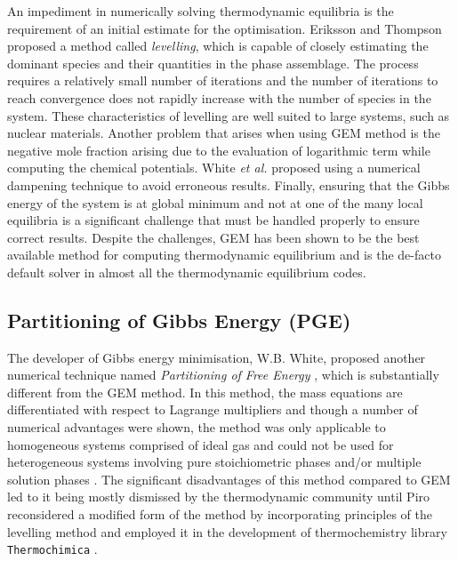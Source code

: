 	An impediment in numerically solving thermodynamic equilibria is the requirement of an initial estimate for the optimisation. Eriksson and Thompson \cite{Eriksson89} proposed a method called \emph{levelling}, which is capable of closely estimating the dominant species and their quantities in the phase assemblage. The process requires a relatively small number of iterations and the number of iterations to reach convergence does not rapidly increase with the number of species in the system. These characteristics of levelling are well suited to large systems, such as nuclear materials. Another problem that arises when using GEM method is the negative mole fraction arising due to the evaluation of logarithmic term while computing the chemical potentials. White \textit{et al.} proposed using a numerical dampening technique to avoid erroneous results. Finally, ensuring that the Gibbs energy of the system is at global minimum and not at one of the many local equilibria is a significant challenge that must be handled properly to ensure correct results. Despite the challenges, GEM has been shown to be the best available method for computing thermodynamic equilibrium and is the de-facto default solver in almost all the thermodynamic equilibrium codes.

	\subsection{Partitioning of Gibbs Energy (PGE)}
	The developer of Gibbs energy minimisation, W.B. White, proposed another numerical technique named \emph{Partitioning of Free Energy}  \cite{White67}, which is substantially different from the GEM method. In this method, the mass equations are differentiated with respect to Lagrange multipliers and though a number of numerical advantages were shown, the method was only applicable to homogeneous systems comprised of ideal gas and could not be used for heterogeneous systems involving pure stoichiometric phases and/or multiple solution phases \cite{White67,vanZeggeren11}. The significant disadvantages of this method compared to GEM led to it being mostly dismissed by the thermodynamic community until Piro \cite{Piro11b} reconsidered a modified form of the method by incorporating principles of the levelling method and employed it in the development of thermochemistry library \texttt{Thermochimica} \cite{Piro13}.

